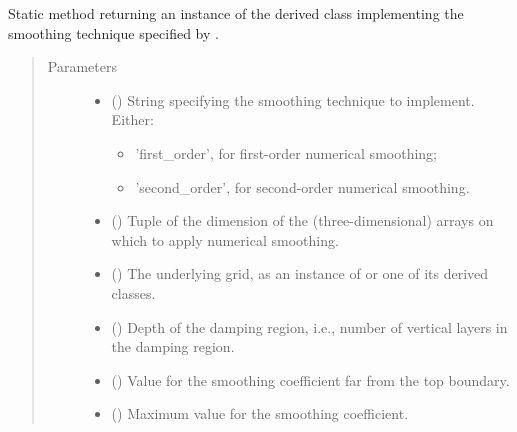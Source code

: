 \documentclass[letterpaper,10pt,english]{sphinxmanual}
\begin{document}
\begin{fulllineitems}
\begin{fulllineitems}
\label{\detokenize{api:tasmania.dycore.horizontal_smoothing.HorizontalSmoothing.factory}}
Static method returning an instance of the derived class implementing the smoothing technique
specified by .
\begin{quote}\begin{description}
\item[{Parameters}] \leavevmode\begin{itemize}
\item {} 
 () \textendash{} 
String specifying the smoothing technique to implement. Either:
\begin{itemize}
\item {} 
’first\_order’, for first-order numerical smoothing;

\item {} 
’second\_order’, for second-order numerical smoothing.

\end{itemize}


\item {} 
 () \textendash{} Tuple of the dimension of the (three-dimensional) arrays on which to apply numerical smoothing.

\item {} 
 () \textendash{} The underlying grid, as an instance of {\hyperref[\detokenize{api:tasmania.grids.grid_xyz.GridXYZ}]{}} or one of its derived classes.

\item {} 
 () \textendash{} Depth of the damping region, i.e., number of vertical layers in the damping region.

\item {} 
 () \textendash{} Value for the smoothing coefficient far from the top boundary.

\item {} 
 () \textendash{} Maximum value for the smoothing coefficient.


\end{itemize}
\end{description}
\end{quote}
\end{fulllineitems}
\end{fulllineitems}
\end{document}
